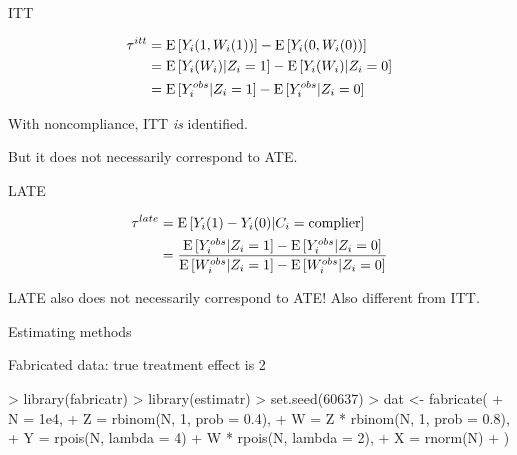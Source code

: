 \documentclass[xcolor={dvipsnames},handout]{beamer}
\begin{document}
\begin{frame}{ITT}

\begin{align*}
\tau^{itt} & = {\textrm E}\,[Y_i(1,W_i(1))] - {\textrm E}\,[Y_i(0,W_i(0))] \\
            & = {\textrm E}\,[Y_i(W_i)| Z_i = 1] - {\textrm E}\,[Y_i(W_i)| Z_i = 0] \\
            & = {\textrm E}\,[Y_i^{obs} | Z_i = 1] - {\textrm E}\,[Y_i^{obs} | Z_i = 0]
\end{align*}


With noncompliance, ITT \textit{is} identified.


But it does not necessarily correspond to ATE.

\end{frame}



\begin{frame}{LATE}

\begin{align*}
\tau^{late} & = {\textrm E}\,[Y_i(1) - Y_i(0) | C_i = \text{complier}] \\
            & = \frac{{\textrm E}\,[Y_i^{obs} | Z_i = 1] - {\textrm E}\,[Y_i^{obs} | Z_i = 0]}{{\textrm E}\,[W_i^{obs} | Z_i = 1] - {\textrm E}\,[W_i^{obs} | Z_i = 0]}
\end{align*}



LATE also does not necessarily correspond to ATE!  Also different from ITT.

\end{frame}



\begin{frame}[fragile]{Estimating methods}

Fabricated data: true treatment effect is 2

\begin{Schunk}
\begin{Sinput}
> library(fabricatr)
> library(estimatr)
> set.seed(60637)
> dat <- fabricate(
+   N = 1e4,
+   Z = rbinom(N, 1, prob = 0.4),
+   W  = Z * rbinom(N, 1, prob = 0.8),
+   Y = rpois(N, lambda = 4) + W * rpois(N, lambda = 2),
+   X = rnorm(N)
+ )
\end{Sinput}
\end{Schunk}



\end{frame}
\end{document}
